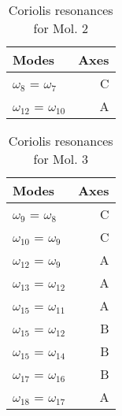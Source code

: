 \begin{table}
\centering
\caption{Coriolis resonances for Mol. 2}
\begin{tabular}{lr}
   Modes &     Axes \\
\hline
$\omega_{8 }$ = $\omega_{7 }$   &  C \\
$\omega_{12}$ = $\omega_{10}$   &  A \\
\end{tabular}
\end{table}

\begin{table}
\centering
\caption{Coriolis resonances for Mol. 3}
\begin{tabular}{lr}
   Modes &     Axes \\
\hline
$\omega_{9 }$ = $\omega_{8 }$   &  C \\
$\omega_{10}$ = $\omega_{9 }$   &  C \\
$\omega_{12}$ = $\omega_{9 }$   &  A \\
$\omega_{13}$ = $\omega_{12}$   &  A \\
$\omega_{15}$ = $\omega_{11}$   &  A \\
$\omega_{15}$ = $\omega_{12}$   &  B \\
$\omega_{15}$ = $\omega_{14}$   &  B \\
$\omega_{17}$ = $\omega_{16}$   &  B \\
$\omega_{18}$ = $\omega_{17}$   &  A \\
\end{tabular}
\end{table}

